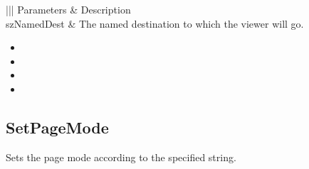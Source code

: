 \documentclass[letterpaper,12pt,english,openany,oneside]{sphinxmanual}
\begin{document}

\begin{sphinxVerbatim}[commandchars=\\\{\}]
  
\end{sphinxVerbatim}
\label{\detokenize{IAC_API_OLE_Objects:parameters-87}}


\begin{savenotes}\sphinxattablestart
\centering
{}\label{\detokenize{IAC_API_OLE_Objects:section-102}}\nobreak
\begin{tabular}[t]{|||}
\hline
\sphinxstyletheadfamily 
Parameters
&\sphinxstyletheadfamily 
Description
\\
\hline
szNamedDest
&
The named destination to which the viewer will go.
\\
\hline
\end{tabular}
\par
\sphinxattableend\end{savenotes}
\label{\detokenize{IAC_API_OLE_Objects:related-methods-148}}
\begin{itemize}
\item {} 
 

\item {} 
 

\item {} 
 

\item {} 
 

\end{itemize}




\subsection{SetPageMode}
\label{\detokenize{IAC_API_OLE_Objects:setpagemode}}
Sets the page mode according to the specified string.
\end{document}
